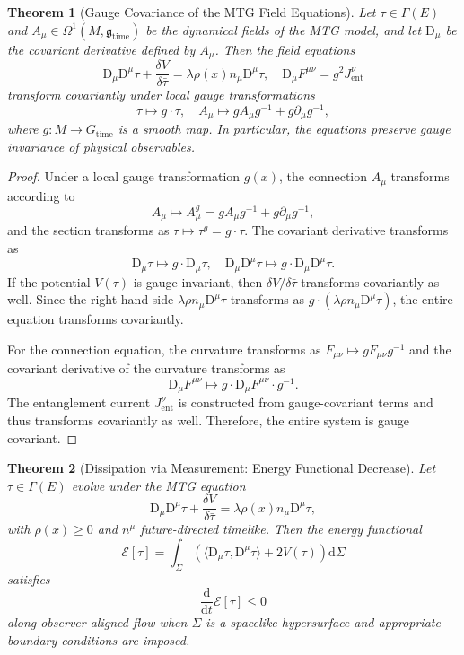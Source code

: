 \documentclass[11pt]{article}
\newtheorem{theorem}{Theorem}
\begin{document}

\begin{theorem}[Gauge Covariance of the MTG Field Equations]
Let $\tau \in \Gamma(E)$ and $A_\mu \in \Omega^1(M, \mathfrak{g}_{\mathrm{time}})$ be the dynamical fields of the MTG model, and let $\mathrm{D}_\mu$ be the covariant derivative defined by $A_\mu$. Then the field equations
\[
\mathrm{D}_\mu \mathrm{D}^\mu \tau + \frac{\delta V}{\delta \bar{\tau}} = \lambda \rho(x) n_\mu \mathrm{D}^\mu \tau, \quad \mathrm{D}_\mu F^{\mu\nu} = g^2 J^\nu_{\mathrm{ent}}
\]
transform covariantly under local gauge transformations
\[
\tau \mapsto g \cdot \tau, \quad A_\mu \mapsto g A_\mu g^{-1} + g \partial_\mu g^{-1},
\]
where $g: M \to G_{\mathrm{time}}$ is a smooth map. In particular, the equations preserve gauge invariance of physical observables.
\end{theorem}

\begin{proof}
Under a local gauge transformation $g(x)$, the connection $A_\mu$ transforms according to
\[
A_\mu \mapsto A_\mu^g = g A_\mu g^{-1} + g \partial_\mu g^{-1},
\]
and the section transforms as $\tau \mapsto \tau^g = g \cdot \tau$. The covariant derivative transforms as
\[
\mathrm{D}_\mu \tau \mapsto g \cdot \mathrm{D}_\mu \tau, \quad \mathrm{D}_\mu \mathrm{D}^\mu \tau \mapsto g \cdot \mathrm{D}_\mu \mathrm{D}^\mu \tau.
\]
If the potential $V(\tau)$ is gauge-invariant, then $\delta V / \delta \bar{\tau}$ transforms covariantly as well. Since the right-hand side $\lambda \rho n_\mu \mathrm{D}^\mu \tau$ transforms as $g \cdot (\lambda \rho n_\mu \mathrm{D}^\mu \tau)$, the entire equation transforms covariantly.

For the connection equation, the curvature transforms as $F_{\mu\nu} \mapsto g F_{\mu\nu} g^{-1}$ and the covariant derivative of the curvature transforms as
\[
\mathrm{D}_\mu F^{\mu\nu} \mapsto g \cdot \mathrm{D}_\mu F^{\mu\nu} \cdot g^{-1}.
\]
The entanglement current $J^\nu_{\mathrm{ent}}$ is constructed from gauge-covariant terms and thus transforms covariantly as well. Therefore, the entire system is gauge covariant.
\end{proof}

\begin{theorem}[Dissipation via Measurement: Energy Functional Decrease]
Let $\tau \in \Gamma(E)$ evolve under the MTG equation
\[
\mathrm{D}_\mu \mathrm{D}^\mu \tau + \frac{\delta V}{\delta \bar{\tau}} = \lambda \rho(x) n_\mu \mathrm{D}^\mu \tau,
\]
with $\rho(x) \geq 0$ and $n^\mu$ future-directed timelike. Then the energy functional
\[
\mathcal{E}[\tau] = \int_\Sigma \left( \langle \mathrm{D}_\mu \tau, \mathrm{D}^\mu \tau \rangle + 2 V(\tau) \right) \mathrm{d} \Sigma
\]
satisfies
\[
\frac{\mathrm{d}}{\mathrm{d}t} \mathcal{E}[\tau] \leq 0
\]
along observer-aligned flow when $\Sigma$ is a spacelike hypersurface and appropriate boundary conditions are imposed.
\end{theorem}
\end{document}
